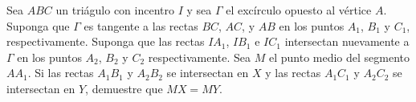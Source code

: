 Sea $ABC$ un triágulo con incentro $I$ y sea $\Gamma$ el excírculo opuesto al vértice $A$. Suponga que $\Gamma$ es tangente a las rectas $BC$, $AC$, y $AB$ en los puntos $A_1$, $B_1$ y $C_1$, respectivamente. Suponga que las rectas $IA_1$, $IB_1$ e $IC_1$ intersectan nuevamente a $\Gamma$ en los puntos $A_2$, $B_2$ y $C_2$ respectivamente. Sea $M$ el punto medio del segmento $AA_1$. Si las rectas $A_1B_1$ y $A_2B_2$ se intersectan en $X$ y las rectas $A_1C_1$ y $A_2C_2$ se intersectan en $Y$, demuestre que $MX=MY$.